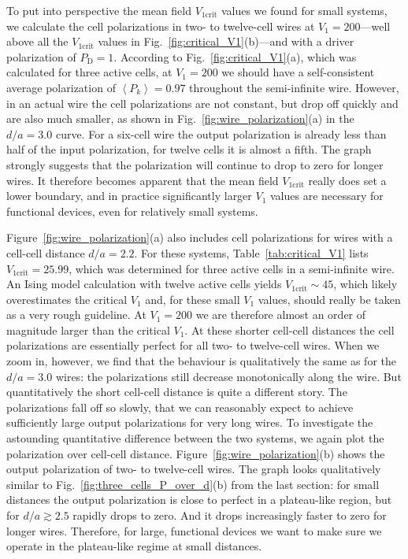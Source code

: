 To put into perspective the mean field $V_{1\textrm{crit}}$ values we found for
small  systems, we calculate the cell polarizations in two- to
twelve-cell wires at $V_1 = 200$---well above all the $V_{1\textrm{crit}}$
values in Fig.~\ref{fig:critical_V1}(b)---and with a driver polarization of $P_\text{D}
= 1$. According to Fig.~\ref{fig:critical_V1}(a), which was calculated for
three active cells, at $V_1 = 200$ we should have a self-consistent average
polarization of $\left< P_k \right> = 0.97$ throughout the semi-infinite wire.
However, in an actual wire the cell polarizations are not constant, but drop off
quickly and are also much smaller, as shown in
Fig.~\ref{fig:wire_polarization}(a) in the $d/a = 3.0$ curve. For a six-cell
wire the output polarization is already less than half of the input
polarization, for twelve cells it is almost a fifth. The graph strongly suggests
that the polarization will continue to drop to zero for longer wires. It
therefore becomes apparent that the mean field $V_{1\textrm{crit}}$ really does
set a lower boundary, and in practice significantly larger $V_1$ values are
necessary for functional  devices, even for relatively small systems.

Figure~\ref{fig:wire_polarization}(a) also includes cell polarizations for wires
with a cell-cell distance $d/a = 2.2$. For these systems,
Table~\ref{tab:critical_V1} lists $V_{1\textrm{crit}} = 25.99$, which was
determined for three active cells in a semi-infinite wire. An Ising model
calculation with twelve active cells yields $V_{1\textrm{crit}} \sim 45$, which
likely overestimates the critical $V_1$ and, for these small $V_1$ values,
should really be taken as a very rough guideline. At $V_1 = 200$ we are
therefore almost an order of magnitude larger than the critical $V_1$. At these
shorter cell-cell distances the cell polarizations are essentially perfect for
all two- to twelve-cell wires. When we zoom in, however, we find that the
behaviour is qualitatively the same as for the $d/a = 3.0$ wires: the
polarizations still decrease monotonically along the wire. But quantitatively
the short cell-cell distance is quite a different story. The polarizations fall
off so slowly, that we can reasonably expect to achieve sufficiently large
output polarizations for very long wires. To investigate the astounding
quantitative difference between the two systems, we again plot the polarization
over cell-cell distance. Figure~\ref{fig:wire_polarization}(b) shows the output
polarization of two- to twelve-cell wires. The graph looks qualitatively similar
to Fig.~\ref{fig:three_cells_P_over_d}(b) from the last section: for small
distances the output polarization is close to perfect in a plateau-like region,
but for $d/a \gtrsim 2.5$ rapidly drops to zero. And it drops increasingly
faster to zero for longer wires. Therefore, for large, functional 
devices we want to make sure we operate in the plateau-like regime at small
distances.


